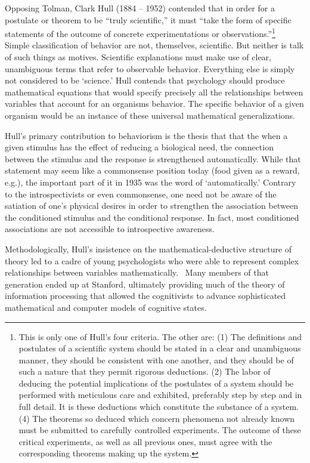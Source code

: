 \begin{refsection}
Opposing Tolman, Clark Hull (1884 – 1952) contended that in order for a postulate or theorem to be ``truly scientific,'' it must ``take the form of specific statements of the outcome of concrete experimentations or observations.''\footnote{This is only one of Hull's four criteria. The other are: (1) The definitions and postulates of a scientific system should be stated in a clear and unambiguous manner, they should be consistent with one another, and they should be of such a nature that they permit rigorous deductions. (2) The labor of deducing the potential implications of the postulates of a system should be performed with meticulous care and exhibited, preferably step by step and in full detail. It is these deductions which constitute the substance of a system. (4) The theorems so deduced which concern phenomena not already known must be submitted to carefully controlled experiments. The outcome of these critical experiments, as well as all previous ones, must agree with the corresponding theorems making up the system.} ~\citep{Hull:1940tm} Simple classification of behavior are not, themselves, scientific. But neither is talk of such things as motives. Scientific explanations must make use of clear, unambiguous terms that refer to observable behavior. Everything else is simply not considered to be `science.' Hull contends that psychology should produce mathematical equations that would specify precisely all the relationships between variables that account for an organisms behavior. The specific behavior of a given organism would be an instance of these universal mathematical generalizations.

Hull's primary contribution to behaviorism is the thesis that that the when a given stimulus has the effect of reducing a biological need, the connection between the stimulus and the response is strengthened automatically. While that statement may seem like a commonsense position today (food given as a reward, e.g.), the important part of it in 1935 was the word of `automatically.' Contrary to the introspectivists or even commonsense, one need not be aware of the satiation of one's physical desires in order to strengthen the association between the conditioned stimulus and the conditional response. In fact, most conditioned associations are not accessible to introspective awareness.

Methodologically, Hull's insistence on the mathematical-deductive structure of theory led to a cadre of young psychologists who were able to represent complex relationships between variables mathematically.~\citep{Hull:1940tm} Many members of that generation ended up at Stanford, ultimately providing much of the theory of information processing that allowed the cognitivists to advance sophisticated mathematical and computer models of cognitive states.


\end{refsection}
